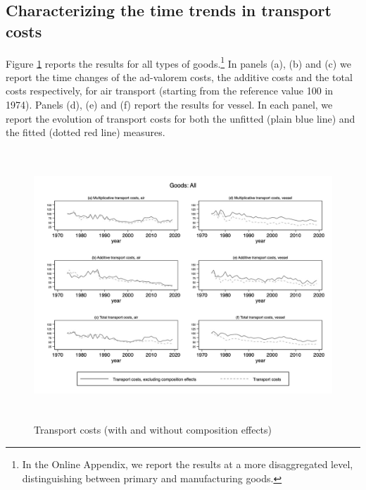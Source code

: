 \documentclass[a4paper,11pt]{article}
\begin{document}
\subsection{Characterizing the time trends in transport costs}
Figure \ref{fig:totalTC_compeffects_excl} reports the results for all types of goods.\footnote{In the Online Appendix, we report the results at a more disaggregated level, distinguishing between primary and manufacturing goods.} In panels (a), (b) and (c) we report the time changes of the ad-valorem costs, the additive costs and the total costs respectively, for air transport (starting from the reference value 100 in 1974).
Panels (d), (e) and (f) report the results for vessel.
In each panel, we report the evolution of transport costs for both the unfitted (plain blue line) and the fitted (dotted red line) measures.


\begin{figure}[htbp]
\caption{Transport costs (with and without composition effects)}
\label{fig:totalTC_compeffects_excl}
\begin{center}
\includegraphics[height=4in]
{graph_composition_all.jpg}
\end{center}
\end{figure}
\end{document}
